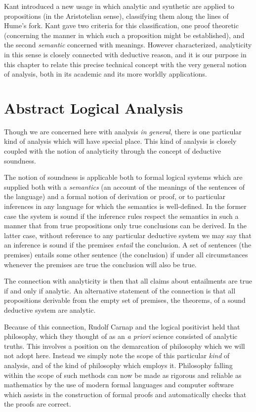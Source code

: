 Kant introduced a new usage in which analytic and
synthetic are applied to propositions (in the Aristotelian sense),
classifying them along the lines of Hume's fork. 
Kant gave two criteria for this classification, one proof theoretic
(concerning the manner in which such a proposition might be
established), and the second \emph{semantic} concerned with meanings. 
However characterized, analyticity in this sense is closely connected
with deductive reason, and it is our purpose in this chapter to relate
this precise technical concept with the very general notion of
analysis, both in its academic and its more worldly applications. 

\section{Abstract Logical Analysis}

Though we are concerned here with analysis \emph{in general}, there is
one particular kind of analysis which will have special place.
This kind of analysis is closely coupled with the notion of
analyticity through the concept of deductive soundness.

The notion of soundness is applicable both to formal logical systems
which are supplied both with a \emph{semantics} (an account of the
meanings of the sentences of the language) and a formal notion of
derivation or proof, or to particular inferences in any language for
which the semantics is well-defined.
In the former case the system is sound if the inference rules respect
the semantics in such a manner that from true propositions only true
conclusions can be derived.
In the latter case, without reference to any particular deductive
system we may say that an inference is sound if the premises
\emph{entail} the conclusion.
A set of sentences (the premises) entails some other sentence (the
conclusion) if under all circumstances whenever the premises are true
the conclusion will also be true. 

The connection with analyticity is then that all claims about
entailments are true if and only if analytic.
An alternative statement of the connection is that all propositions
derivable from the empty set of premises, the theorems, of a sound
deductive system are analytic.

Because of this connection, Rudolf Carnap and the logical positivist
held that philosophy, which they thought of as an \emph{a priori}
science consisted of analytic truths.
This involves a position on the demarcation of philosophy which we
will not adopt here.
Instead we simply note the scope of this particular \emph{kind} of
analysis, and of the kind of philosophy which employs it.
Philosophy falling within the scope of such methods can now be made as
rigorous and reliable as mathematics by the use of modern formal
languages and computer software which assists in the construction of
formal proofs and automatically checks that the proofs are correct.

